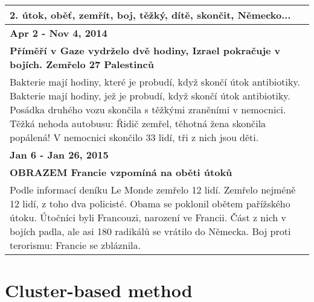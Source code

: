 \begin{tabularx}{\linewidth}{p{\linewidth}} \toprule[1.5pt]
\bf 2. útok, oběť, zemřít, boj, těžký, dítě, skončit, Německo... \\ \midrule
\bf Apr 2 - Nov 4, 2014 \\ \midrule
\bf Příměří v Gaze vydrželo dvě hodiny, Izrael pokračuje v bojích. Zemřelo 27 Palestinců \\
Bakterie mají hodiny, které je probudí, když skončí útok antibiotiky. Bakterie mají hodiny, jež je probudí, když skončí útok antibiotiky. Posádka druhého vozu skončila s těžkými zraněními v nemocnici. Těžká nehoda autobusu: Řidič zemřel, těhotná žena skončila popálená! V nemocnici skončilo 33 lidí, tři z nich jsou děti. \\ \bottomrule[1.25pt]

\bf Jan 6 - Jan 26, 2015 \\ \midrule
\bf OBRAZEM Francie vzpomíná na oběti útoků \\
Podle informací deníku Le Monde zemřelo 12 lidí. Zemřelo nejméně 12 lidí, z toho dva policisté. Obama se poklonil obětem pařížského útoku. Útočníci byli Francouzi, narození ve Francii. Část z nich v bojích padla, ale asi 180 radikálů se vrátilo do Německa. Boj proti terorismu: Francie se zbláznila. \\ \bottomrule[1.25pt]

\end{tabularx}
\par


\section{Cluster-based method}
